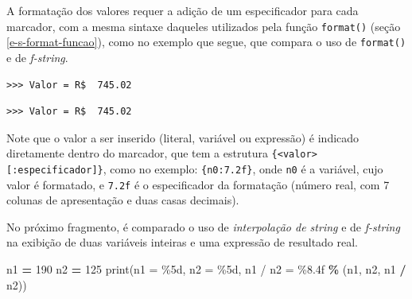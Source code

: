 \documentclass[
]{book}
\newenvironment{Shaded}{\begin{snugshade}}{\end{snugshade}}
\newcommand{\BuiltInTok}[1]{#1}
\newcommand{\DecValTok}[1]{\textcolor[rgb]{0.00,0.00,0.81}{#1}}
\newcommand{\FloatTok}[1]{\textcolor[rgb]{0.00,0.00,0.81}{#1}}
\newcommand{\NormalTok}[1]{#1}
\newcommand{\OperatorTok}[1]{\textcolor[rgb]{0.81,0.36,0.00}{\textbf{#1}}}
\newcommand{\SpecialCharTok}[1]{\textcolor[rgb]{0.00,0.00,0.00}{#1}}
\newcommand{\SpecialStringTok}[1]{\textcolor[rgb]{0.31,0.60,0.02}{#1}}
\newcommand{\StringTok}[1]{\textcolor[rgb]{0.31,0.60,0.02}{#1}}
\begin{document}
A formatação dos valores requer a adição de um especificador para cada marcador, com a mesma sintaxe daqueles utilizados pela função \texttt{format()} (seção \ref{e-s-format-funcao}), como no exemplo que segue, que compara o uso de \texttt{format()} e de \emph{f-string}.

\begin{Shaded}
\end{Shaded}

\begin{verbatim}
>>> Valor = R$  745.02
\end{verbatim}

\begin{Shaded}
\end{Shaded}

\begin{verbatim}
>>> Valor = R$  745.02
\end{verbatim}

Note que o valor a ser inserido (literal, variável ou expressão) é indicado diretamente dentro do marcador, que tem a estrutura \texttt{\{\textless{}valor\textgreater{}{[}:especificador{]}\}}, como no exemplo: \texttt{\{n0:7.2f\}}, onde \texttt{n0} é a variável, cujo valor é formatado, e \texttt{7.2f} é o especificador da formatação (número real, com 7 colunas de apresentação e duas casas decimais).

No próximo fragmento, é comparado o uso de \emph{interpolação de string} e de \emph{f-string} na exibição de duas variáveis inteiras e uma expressão de resultado real.

\begin{Shaded}
\begin{Highlighting}[]
\NormalTok{n1 }\OperatorTok{=} \DecValTok{190}
\NormalTok{n2 }\OperatorTok{=} \DecValTok{125}
\BuiltInTok{print}\NormalTok{(}\StringTok{\textquotesingle{}n1 = }\SpecialCharTok{\%5d}\StringTok{, n2 = }\SpecialCharTok{\%5d}\StringTok{, n1 / n2 = }\SpecialCharTok{\%8.4f}\StringTok{\textquotesingle{}} \OperatorTok{\%}\NormalTok{ (n1, n2, n1 }\OperatorTok{/}\NormalTok{ n2))}
\end{Highlighting}
\end{Shaded}
\end{document}
